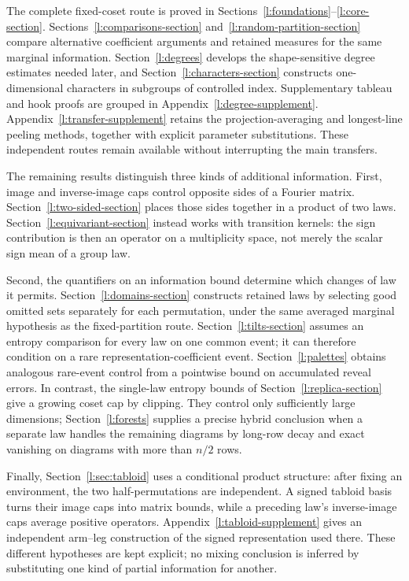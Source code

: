 The complete fixed-coset route is proved in Sections~\ref{l:foundations}--\ref{l:core-section}. Sections~\ref{l:comparisons-section} and~\ref{l:random-partition-section} compare alternative coefficient arguments and retained measures for the same marginal information. Section~\ref{l:degrees} develops the shape-sensitive degree estimates needed later, and Section~\ref{l:characters-section} constructs one-dimensional characters in subgroups of controlled index. Supplementary tableau and hook proofs are grouped in Appendix~\ref{l:degree-supplement}. Appendix~\ref{l:transfer-supplement} retains the projection-averaging and longest-line peeling methods, together with explicit parameter substitutions. These independent routes remain available without interrupting the main transfers.

The remaining results distinguish three kinds of additional information. First, image and inverse-image caps control opposite sides of a Fourier matrix. Section~\ref{l:two-sided-section} places those sides together in a product of two laws. Section~\ref{l:equivariant-section} instead works with transition kernels: the sign contribution is then an operator on a multiplicity space, not merely the scalar sign mean of a group law.

Second, the quantifiers on an information bound determine which changes of law it permits. Section~\ref{l:domains-section} constructs retained laws by selecting good omitted sets separately for each permutation, under the same averaged marginal hypothesis as the fixed-partition route. Section~\ref{l:tilts-section} assumes an entropy comparison for every law on one common event; it can therefore condition on a rare representation-coefficient event. Section~\ref{l:palettes} obtains analogous rare-event control from a pointwise bound on accumulated reveal errors. In contrast, the single-law entropy bounds of Section~\ref{l:replica-section} give a growing coset cap by clipping. They control only sufficiently large dimensions; Section~\ref{l:forests} supplies a precise hybrid conclusion when a separate law handles the remaining diagrams by long-row decay and exact vanishing on diagrams with more than $n/2$ rows.

Finally, Section~\ref{l:sec:tabloid} uses a conditional product structure: after fixing an environment, the two half-permutations are independent. A signed tabloid basis turns their image caps into matrix bounds, while a preceding law's inverse-image caps average positive operators. Appendix~\ref{l:tabloid-supplement} gives an independent arm--leg construction of the signed representation used there. These different hypotheses are kept explicit; no mixing conclusion is inferred by substituting one kind of partial information for another.

